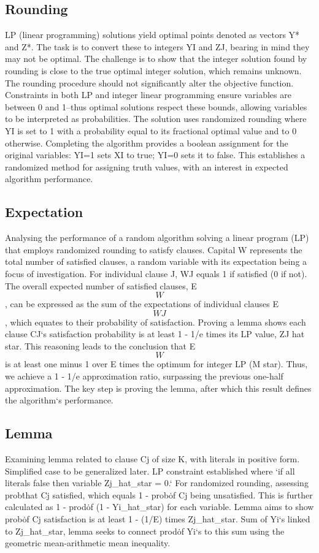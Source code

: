 \subsection*{Rounding}
LP (linear programming) solutions yield optimal points denoted as vectors Y* and Z*.
The task is to convert these to integers YI and ZJ, bearing in mind they may not be optimal.
The challenge is to show that the integer solution found by rounding is close to the true optimal integer solution, which remains unknown.
The rounding procedure should not significantly alter the objective function.
Constraints in both LP and integer linear programming ensure variables are between 0 and 1--thus optimal solutions respect these bounds, allowing variables to be interpreted as probabilities.
The solution uses randomized rounding where YI is set to 1 with a probability equal to its fractional optimal value and to 0 otherwise.
Completing the algorithm provides a boolean assignment for the original variables: YI=1 sets XI to true; YI=0 sets it to false.
This establishes a randomized method for assigning truth values, with an interest in expected algorithm performance.

\subsection*{Expectation}
Analysing the performance of a random algorithm solving a linear program (LP) that employs randomized rounding to satisfy clauses.
Capital W represents the total number of satisfied clauses, a random variable with its expectation being a focus of investigation.
For individual clause J, WJ equals 1 if satisfied (0 if not).
The overall expected number of satisfied clauses, E\[W\], can be expressed as the sum of the expectations of individual clauses E\[WJ\], which equates to their probability of satisfaction.
Proving a lemma shows each clause CJ`s satisfaction probability is at least 1 - 1/e times its LP value, ZJ hat star.
This reasoning leads to the conclusion that E\[W\] is at least one minus 1 over E times the optimum for integer LP (M star).
Thus, we achieve a 1 - 1/e approximation ratio, surpassing the previous one-half approximation.
The key step is proving the lemma, after which this result defines the algorithm`s performance.

\subsection*{Lemma}
Examining lemma related to clause Cj of size K, with literals in positive form.
Simplified case to be generalized later.
LP constraint established where `if all literals false then variable Zj\_hat\_star = 0.` For randomized rounding, assessing prob\. that Cj satisfied, which equals 1 - prob\. of Cj being unsatisfied.
This is further calculated as 1 - prod\. of (1 - Yi\_hat\_star) for each variable.
Lemma aims to show prob\. of Cj satisfaction is at least 1 - (1/E) times Zj\_hat\_star.
Sum of Yi`s linked to Zj\_hat\_star, lemma seeks to connect prod\. of Yi`s to this sum using the geometric mean-arithmetic mean inequality.


